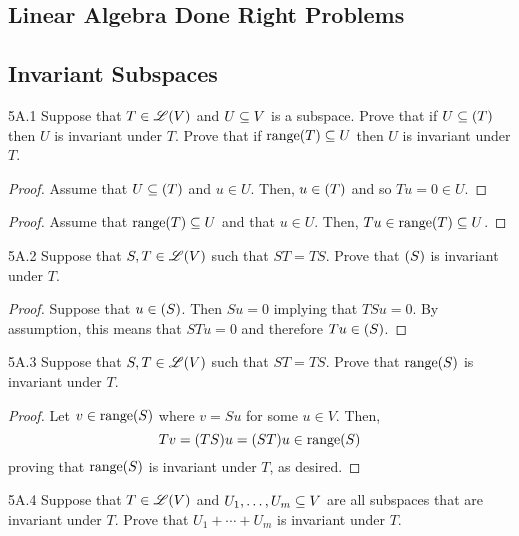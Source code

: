 \documentclass[../../AlgebraQualSolutions.tex]{subfiles}
\begin{document}
\subsection{Linear Algebra Done Right Problems}

\subsection{Invariant Subspaces}
\begin{LA}{5A.1}{}
Suppose that $T \in \mathscr{L}(V)$ and $U \subseteq V$ is a subspace. Prove that if $U \sq \null(T)$ then $U$ is invariant under $T$. Prove that if $\mathrm{range}(T) \subseteq U$ then $U$ is invariant under $T$.
\end{LA}

\begin{proof}
Assume that $U \sq \null(T)$ and $u \in U$. Then, $u \in \null(T)$ and so $Tu = 0 \in U$.
\end{proof}

\begin{proof}
Assume that $\mathrm{range}(T) \subseteq U$ and that $u \in U$. Then, $Tu \in \mathrm{range}(T) \subseteq U$.
\end{proof}

\begin{LA}{5A.2}{}
Suppose that $S,T \in \mathscr{L}(V)$ such that $ST = TS$. Prove that $\null(S)$ is invariant under $T$.
\end{LA}

\begin{proof}
Suppose that $u \in \null(S)$. Then $S u = 0$ implying that $TS u = 0$. By assumption, this means that $STu = 0$ and therefore $Tu \in \null(S)$.
\end{proof}

\begin{LA}{5A.3}{}
Suppose that $S,T \in \mathscr{L}(V)$ such that $ST = TS$. Prove that $\mathrm{range}(S)$ is invariant under $T$.
\end{LA}

\begin{proof}
Let $v \in \mathrm{range}(S)$ where $v = Su$ for some $u \in V$. Then,
	\[Tv = (TS) u = (ST)u \in \mathrm{range}(S) \]
proving that $\mathrm{range}(S)$ is invariant under $T$, as desired.
\end{proof}

\begin{LA}{5A.4}{}
Suppose that $T \in \mathscr{L}(V)$ and $U_1, \ldots, U_m \subseteq V$ are all subspaces that are invariant under $T$. Prove that $U_1 + \cdots + U_m$ is invariant under $T$.
\end{LA}
\end{document}
